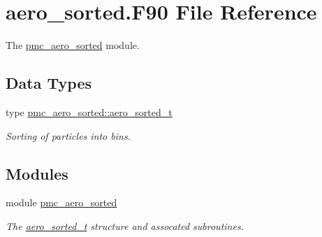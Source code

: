 \hypertarget{aero__sorted_8_f90}{}\section{aero\+\_\+sorted.\+F90 File Reference}
\label{aero__sorted_8_f90}


The \mbox{\hyperlink{namespacepmc__aero__sorted}{pmc\+\_\+aero\+\_\+sorted}} module.  


\subsection*{Data Types}
\begin{DoxyCompactItemize}
\item 
type \mbox{\hyperlink{structpmc__aero__sorted_1_1aero__sorted__t}{pmc\+\_\+aero\+\_\+sorted\+::aero\+\_\+sorted\+\_\+t}}
\begin{DoxyCompactList}\small\item\em Sorting of particles into bins. \end{DoxyCompactList}\end{DoxyCompactItemize}
\subsection*{Modules}
\begin{DoxyCompactItemize}
\item 
module \mbox{\hyperlink{namespacepmc__aero__sorted}{pmc\+\_\+aero\+\_\+sorted}}
\begin{DoxyCompactList}\small\item\em The \mbox{\hyperlink{structpmc__aero__sorted_1_1aero__sorted__t}{aero\+\_\+sorted\+\_\+t}} structure and assocated subroutines. \end{DoxyCompactList}\end{DoxyCompactItemize}
